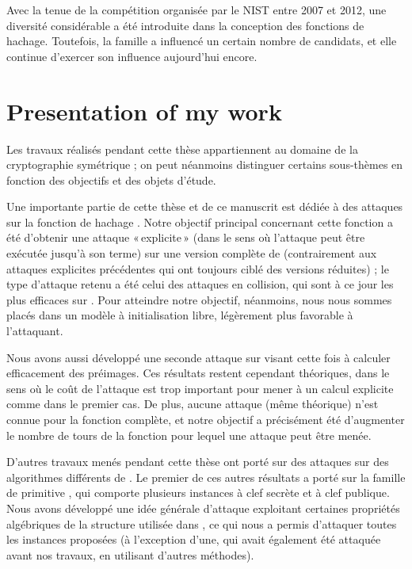 Avec la tenue de la compétition \shathree organisée par le NIST entre 2007 et 2012, une diversité considérable a été introduite dans la conception des fonctions de hachage.
Toutefois, la famille \mdsha a influencé un certain nombre de candidats, et elle continue d'exercer son influence aujourd'hui encore.

\chapter[Présentation de mes travaux]{Presentation of my work}

Les travaux réalisés pendant cette thèse appartiennent au domaine de la cryptographie symétrique ; on peut néanmoins distinguer certains sous-thèmes en fonction des objectifs et des objets d'étude.

\medskip

Une importante partie de cette thèse et de ce manuscrit est dédiée à des attaques sur la fonction de hachage \shaone. Notre objectif principal concernant cette fonction a été d'obtenir
une attaque «\,explicite\,» (dans le sens où l'attaque peut être exécutée jusqu'à son terme) sur une version complète de \shaone (contrairement aux attaques explicites précédentes
qui ont toujours ciblé des versions réduites) ; le type d'attaque retenu a été celui des attaques en collision, qui sont à ce jour les plus efficaces sur \shaone.
Pour atteindre notre objectif, néanmoins, nous nous sommes placés dans un modèle à initialisation libre, légèrement plus favorable à l'attaquant.

Nous avons aussi développé une seconde attaque sur \shaone visant cette fois à calculer efficacement des préimages. Ces résultats restent cependant théoriques, dans le sens où le coût
de l'attaque est trop important pour mener à un calcul explicite comme dans le premier cas. De plus, aucune attaque (même théorique) n'est connue pour la fonction complète, et notre
objectif a précisément été d'augmenter le nombre de tours de la fonction pour lequel une attaque peut être menée.

\medskip

D'autres travaux menés pendant cette thèse ont porté sur des attaques sur des algorithmes différents de \shaone. Le premier de ces autres résultats a porté sur la famille de primitive
\asasa, qui comporte plusieurs instances à clef secrète et à clef publique. Nous avons développé une idée générale d'attaque exploitant certaines propriétés algébriques de la
structure utilisée dans \asasa, ce qui nous a permis d'attaquer toutes les instances proposées (à l'exception d'une, qui avait également été attaquée avant nos travaux, en utilisant
d'autres méthodes).

